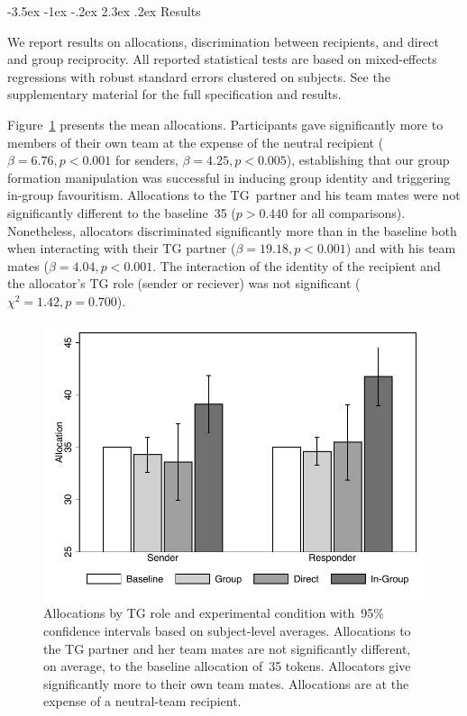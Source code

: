 \documentclass[12pt,a4paper]{article}
\makeatletter
\renewcommand\section{\@startsection {section}{1}{\z@}%
{-3.5ex \@plus -1ex \@minus -.2ex}%
{2.3ex \@plus.2ex}%
{\bf\sffamily\Large}}
\def\figwidth{\textwidth}
\makeatother
\begin{document}
\section{Results}
\label{sec:results}

We report results on allocations, discrimination between recipients, and direct and group reciprocity. All reported statistical tests are based on mixed-effects regressions with robust standard errors clustered on subjects. See the supplementary material for the full specification and results.

Figure~\ref{fig:allocations} presents the mean allocations. Participants gave significantly more to members of their own team at the expense of the neutral recipient ($\beta = 6.76, p<0.001$ for senders, $\beta = 4.25, p<0.005$), establishing that our group formation manipulation was successful in inducing group identity and triggering in-group favouritism. Allocations to the TG~partner and his team mates were not significantly different to the baseline~35 ($p>0.440$ for all comparisons). Nonetheless, allocators discriminated significantly more than in the baseline both when interacting with their TG partner ($\beta = 19.18, p<0.001$) and with his team mates ($\beta = 4.04, p<0.001$. The interaction of the identity of the recipient and the allocator's TG role (sender or reciever) was not significant ($\chi^2 = 1.42, p = 0.700$).

\begin{figure}
\caption{
Allocations by TG role and experimental condition with~95\% confidence intervals based on subject-level averages. Allocations to the TG partner and her team mates are not significantly different, on average, to the baseline allocation of~35 tokens. Allocators give significantly more to their own team mates. Allocations are at the expense of a neutral-team recipient.
}
\label{fig:allocations}
\begin{center}
	\includegraphics[width=\figwidth]{Allocations.pdf}
\end{center}
\end{figure}
\end{document}
